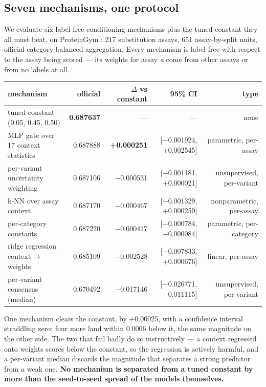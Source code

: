 \documentclass{article}
\begin{document}
\subsection{Seven mechanisms, one protocol}\label{seven-mechanisms-one-protocol}

We evaluate six label-free conditioning mechanisms plus the tuned constant they all must beat, on
ProteinGym \cite{proteingym}: 217 substitution assays, 651 assay-by-split units, official
category-balanced aggregation. Every mechanism is label-free with respect to the assay being scored ---
its weights for assay \emph{a} come from other assays or from no labels at all.

\begin{table}[t]
\centering
\small
\begin{tabular}{lrrrr}
\hline
mechanism & official & $\Delta$ vs constant & 95\% CI & type \\
\hline
tuned constant (0.05, 0.45, 0.50) & \textbf{0.687637} & --- & --- & none \\
MLP gate over 17 context statistics & 0.687888 & \textbf{+0.000251} & [$-$0.001924, +0.002545] & parametric, per-assay \\
per-variant uncertainty weighting & 0.687106 & $-$0.000531 & [$-$0.001181, +0.000021] & unsupervised, per-variant \\
k-NN over assay context & 0.687170 & $-$0.000467 & [$-$0.001329, +0.000259] & nonparametric, per-assay \\
per-category constants & 0.687220 & $-$0.000417 & [$-$0.000784, $-$0.000084] & parametric, per-category \\
ridge regression context → weights & 0.685109 & $-$0.002528 & [$-$0.007833, +0.000676] & linear, per-assay \\
per-variant consensus (median) & 0.670492 & $-$0.017146 & [$-$0.026771, $-$0.011115] & unsupervised, per-variant \\
\hline
\end{tabular}
\end{table}

One mechanism clears the constant, by +0.00025, with a confidence interval straddling zero; four more
land within 0.0006 below it, the same magnitude on the other side. The two that fail badly do so
instructively --- a context regressed onto weights scores below the constant, so the regression is actively
harmful, and a per-variant median discards the magnitude that separates a strong predictor from a weak
one. \textbf{No mechanism is separated from a tuned constant by more than the seed-to-seed spread of the models
themselves.}
\end{document}
